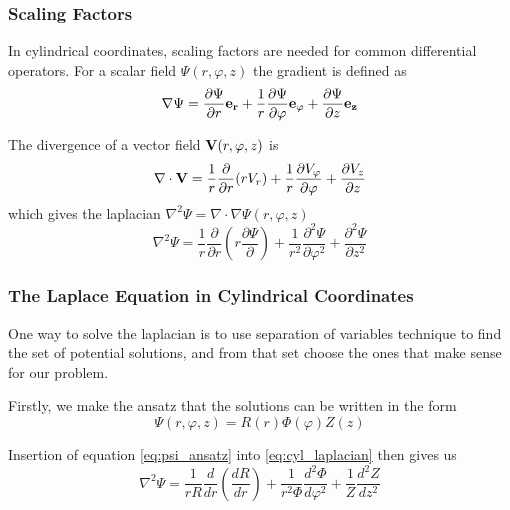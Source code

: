 \subsubsection{Scaling Factors}
In cylindrical coordinates, scaling factors are needed for
common differential operators. For a scalar field $\Psi(r, \varphi, z)$
the gradient is defined as
\begin{equation}
    \nabla \Psi = \frac{\partial \Psi}{\partial r} \vb{e_r} +
    \frac{1}{r} \frac{\partial \Psi}{\partial \varphi} \vb{e_\varphi} +
    \frac{\partial \Psi}{\partial z} \vb{e_z}
    \label{eq:cylgrad}
\end{equation}

The divergence of a vector field $\vb{V}(r, \varphi, z)$ is
\begin{equation}
    \nabla \cdot \vb{V} = \frac{1}{r} \frac{\partial}{\partial r} (rV_r)
    + \frac{1}{r} \frac{\partial V_\varphi}{\partial \varphi}
    + \frac{\partial V_z}{\partial z}
    \label{eq:cyldiv}
\end{equation}
which gives the laplacian $\nabla^2 \Psi = \nabla \cdot \nabla \Psi (r, \varphi, z)$
\begin{equation}
    \nabla^2 \Psi =
    \frac{1}{r} \frac{\partial}{\partial r} \left(r\frac{\partial \Psi}{\partial}\right)
    + \frac{1}{r^2} \frac{\partial^2 \Psi}{\partial \varphi^2}
    + \frac{\partial^2 \Psi}{\partial z^2}
    \label{eq:cyl_laplacian}
\end{equation}
\cite[Ch.3.13]{russenschuck_field_2011}
\subsubsection{The Laplace Equation in Cylindrical Coordinates}
One way to solve the laplacian is to use separation of variables
technique to find the set of potential solutions, and from that
set choose the ones that make sense for our problem.

Firstly, we make the ansatz that the solutions can be written in
the form
\begin{equation}
    \Psi(r, \varphi, z) = R(r)\varPhi(\varphi)Z(z)
    \label{eq:psi_ansatz}
\end{equation}

Insertion of equation \ref{eq:psi_ansatz} into \ref{eq:cyl_laplacian}
then gives us
\begin{equation}
    \nabla^2 \Psi = \frac{1}{rR} \frac{d}{dr} \left(\frac{dR}{dr} \right)
    + \frac{1}{r^2 \varPhi} \frac{d^2 \varPhi}{d\varphi^2}
    + \frac{1}{Z} \frac{d^2 Z}{dz^2}
    \label{eq:sepLaplacian}
\end{equation}

